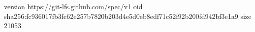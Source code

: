 version https://git-lfs.github.com/spec/v1
oid sha256:fc936017fb3fe62e257b7820b203d4e5d0eb8edf71c52f92b200fd942bf3e1a9
size 21053
